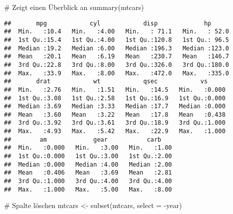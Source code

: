 \documentclass[]{article}
\newenvironment{Shaded}{\begin{snugshade}}{\end{snugshade}}
\newcommand{\KeywordTok}[1]{\textcolor[rgb]{0.94,0.87,0.69}{{#1}}}
\newcommand{\DataTypeTok}[1]{\textcolor[rgb]{0.87,0.87,0.75}{{#1}}}
\newcommand{\DecValTok}[1]{\textcolor[rgb]{0.86,0.86,0.80}{{#1}}}
\newcommand{\StringTok}[1]{\textcolor[rgb]{0.80,0.58,0.58}{{#1}}}
\newcommand{\CommentTok}[1]{\textcolor[rgb]{0.50,0.62,0.50}{{#1}}}
\newcommand{\NormalTok}[1]{\textcolor[rgb]{0.80,0.80,0.80}{{#1}}}
\begin{document}
\begin{Shaded}
\begin{Highlighting}[]
\CommentTok{# Zeigt einen Überblick an}
\KeywordTok{summary}\NormalTok{(mtcars)}
\end{Highlighting}
\end{Shaded}

\begin{verbatim}
##       mpg            cyl            disp             hp       
##  Min.   :10.4   Min.   :4.00   Min.   : 71.1   Min.   : 52.0  
##  1st Qu.:15.4   1st Qu.:4.00   1st Qu.:120.8   1st Qu.: 96.5  
##  Median :19.2   Median :6.00   Median :196.3   Median :123.0  
##  Mean   :20.1   Mean   :6.19   Mean   :230.7   Mean   :146.7  
##  3rd Qu.:22.8   3rd Qu.:8.00   3rd Qu.:326.0   3rd Qu.:180.0  
##  Max.   :33.9   Max.   :8.00   Max.   :472.0   Max.   :335.0  
##       drat            wt            qsec            vs       
##  Min.   :2.76   Min.   :1.51   Min.   :14.5   Min.   :0.000  
##  1st Qu.:3.08   1st Qu.:2.58   1st Qu.:16.9   1st Qu.:0.000  
##  Median :3.69   Median :3.33   Median :17.7   Median :0.000  
##  Mean   :3.60   Mean   :3.22   Mean   :17.8   Mean   :0.438  
##  3rd Qu.:3.92   3rd Qu.:3.61   3rd Qu.:18.9   3rd Qu.:1.000  
##  Max.   :4.93   Max.   :5.42   Max.   :22.9   Max.   :1.000  
##        am             gear           carb     
##  Min.   :0.000   Min.   :3.00   Min.   :1.00  
##  1st Qu.:0.000   1st Qu.:3.00   1st Qu.:2.00  
##  Median :0.000   Median :4.00   Median :2.00  
##  Mean   :0.406   Mean   :3.69   Mean   :2.81  
##  3rd Qu.:1.000   3rd Qu.:4.00   3rd Qu.:4.00  
##  Max.   :1.000   Max.   :5.00   Max.   :8.00
\end{verbatim}

\begin{Shaded}
\end{Shaded}

\begin{Shaded}
\begin{Highlighting}[]
\CommentTok{# Spalte löschen}
\NormalTok{mtcars <-}\StringTok{ }\KeywordTok{subset}\NormalTok{(mtcars, }\DataTypeTok{select =} \NormalTok{-year)}
\end{Highlighting}
\end{Shaded}

\begin{Shaded}
\end{Shaded}
\end{document}

